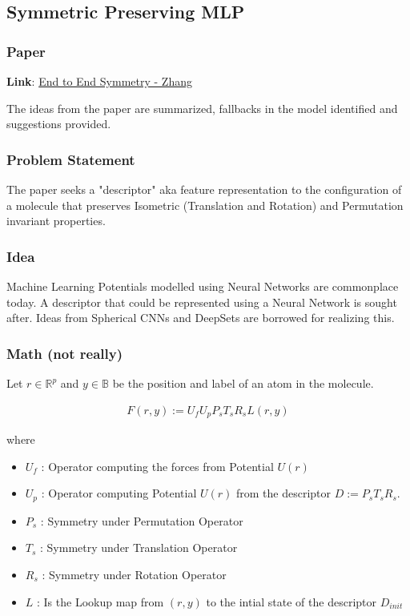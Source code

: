 \subsection{Symmetric Preserving MLP}

\subsubsection*{Paper}
\textbf{Link}: \href{https://arxiv.org/abs/1805.09003}{End to End Symmetry - Zhang} 

The ideas from the paper are summarized, fallbacks in the model identified
and suggestions provided. 

\subsubsection*{Problem Statement}
The paper seeks a "descriptor" aka feature representation to the configuration of a 
molecule that preserves Isometric (Translation and Rotation) and Permutation invariant
properties. 

\subsubsection*{Idea}
Machine Learning Potentials modelled using Neural Networks are commonplace today.
A descriptor that could be represented using a Neural Network is sought after.
Ideas from Spherical CNNs and DeepSets are borrowed for realizing this.

\subsubsection*{Math (not really)}

Let $r \in \mathbb{R}^{p}$ and $y \in \mathbb{B}$ be the position and label of an atom in the molecule.

\begin{align*}
    F(r,y) := U_{f}U_{p}P_{s}T_{s}R_{s} L(r,y) 
\end{align*}

where \\ 
\begin{itemize}
    \item $U_{f}$ : Operator computing the forces from Potential $U(r)$
    \item $U_{p}$ : Operator computing Potential $U(r)$ from the descriptor $D := P_{s}T_{s}R_{s}$.
    \item $P_{s}$ : Symmetry under Permutation Operator
    \item $T_{s}$ : Symmetry under Translation Operator
    \item $R_{s}$ : Symmetry under Rotation Operator
    \item $L$ : Is the Lookup map from $(r,y)$ to the intial state of the descriptor $D_{init}$
\end{itemize}

